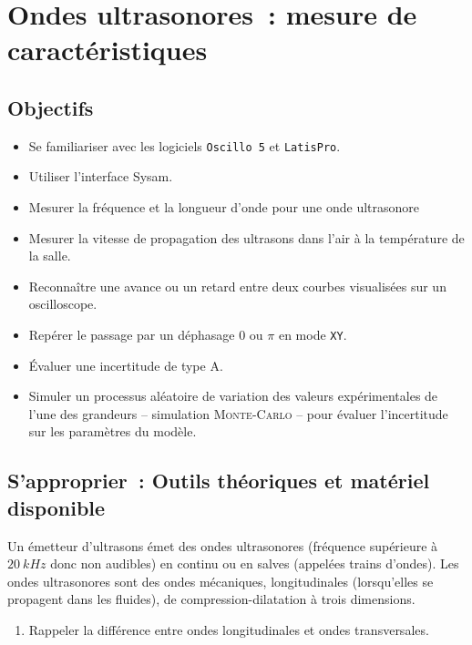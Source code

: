 \documentclass[a4paper, 11pt, final, garamond]{book}
\begin{document}
\setcounter{chapter}{15}

\chapter{Ondes ultrasonores~: mesure de caract\'eristiques}

\section{Objectifs}

\begin{itemize}
    \item Se familiariser avec les logiciels \texttt{Oscillo 5} et
        \texttt{LatisPro}.
    \item Utiliser l'interface Sysam.
    \item Mesurer la fréquence et la longueur d'onde pour une onde ultrasonore
    \item Mesurer la vitesse de propagation des ultrasons dans l'air à la
        température de la salle.
    \item Reconnaître une avance ou un retard entre deux courbes visualisées sur
        un oscilloscope.
    \item Repérer le passage par un déphasage $0$ ou $\pi$ en mode \texttt{XY}.
    \item Évaluer une incertitude de type A.
    \item Simuler un processus aléatoire de variation des valeurs 
        expérimentales de l'une des grandeurs – simulation \textsc{Monte-Carlo}
        – pour évaluer l'incertitude sur les paramètres du modèle. 
\end{itemize}

\section{S'approprier~: Outils théoriques et matériel disponible}

Un émetteur d'ultrasons émet des ondes ultrasonores (fréquence supérieure à
$\SI{20}{kHz}$ donc non audibles) en continu ou en salves (appelées trains
d'ondes). Les ondes ultrasonores sont des ondes mécaniques, longitudinales
(lorsqu'elles se propagent dans les fluides), de compression-dilatation à trois
dimensions. \bigbreak

\begin{enumerate}[label=\clenumi]
    \item Rappeler la différence entre ondes longitudinales et ondes
        transversales.
\end{enumerate} \bigbreak
\end{document}
